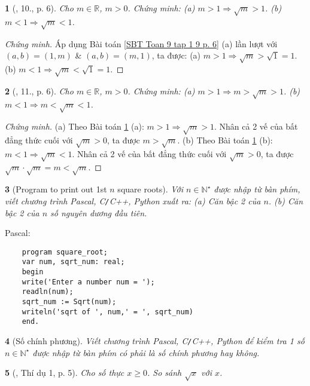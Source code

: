 \documentclass{article}
\newtheorem{baitoan}{}%
\begin{document}
\begin{baitoan}[\cite{SBT_Toan_9_tap_1}, 10., p. 6]
	\label{SBT Toan 9 tap 1 10 p. 6}
	Cho $m \in\mathbb{R}$, $m > 0$. Chứng minh: (a) $m > 1\Rightarrow\sqrt{m} > 1$. (b) $m < 1\Rightarrow\sqrt{m} < 1$.
\end{baitoan}

\begin{proof}[Chứng minh]
	Áp dụng Bài toán \ref{SBT Toan 9 tap 1 9 p. 6} (a) lần lượt với $(a,b) = (1,m)$ \& $(a,b) = (m,1)$, ta được: (a) $m > 1\Rightarrow\sqrt{m} > \sqrt{1} = 1$. (b) $m < 1\Rightarrow\sqrt{m} < \sqrt{1} = 1$.
\end{proof}

\begin{baitoan}[\cite{SBT_Toan_9_tap_1}, 11., p. 6]
	Cho $m \in\mathbb{R}$, $m > 0$. Chứng minh: (a) $m > 1\Rightarrow m > \sqrt{m} > 1$. (b) $m < 1\Rightarrow m < \sqrt{m} < 1$.
\end{baitoan}

\begin{proof}[Chứng minh]
	(a) Theo Bài toán \ref{SBT Toan 9 tap 1 10 p. 6} (a): $m > 1\Rightarrow\sqrt{m} > 1$. Nhân cả 2 vế của bất đẳng thức cuối với $\sqrt{m} > 0$, ta được $m > \sqrt{m}$. (b) Theo Bài toán \ref{SBT Toan 9 tap 1 10 p. 6} (b): $m < 1\Rightarrow\sqrt{m} < 1$. Nhân cả 2 vế của bất đẳng thức cuối với $\sqrt{m} > 0$, ta được $\sqrt{m}\cdot\sqrt{m} = m < \sqrt{m}$.
\end{proof}

\begin{baitoan}[Program to print out 1st $n$ square roots]
	Với $n\in\mathbb{N}^\star$ được nhập từ bàn phím, viết chương trình {\sf Pascal, C\texttt{/}C++, Python} xuất ra: (a) Căn bậc 2 của $n$. (b) Căn bậc 2 của $n$ số nguyên dương đầu tiên. 
\end{baitoan}
Pascal:
\begin{verbatim}
	program square_root;
	var num, sqrt_num: real;		
	begin
	write('Enter a number num = ');
	readln(num);
	sqrt_num := Sqrt(num);
	writeln('sqrt of ', num,' = ', sqrt_num)
	end.
\end{verbatim}

\begin{baitoan}[Số chính phương]
	Viết chương trình {\sf Pascal, C\texttt{/}C++, Python} để kiểm tra 1 số $n\in\mathbb{N}^\star$ được nhập từ bàn phím có phải là số chính phương hay không.
\end{baitoan}

\begin{baitoan}[\cite{Tuyen_Toan_9_old}, Thí dụ 1, p. 5]
	Cho số thực $x\ge0$. So sánh $\sqrt{x}$ với $x$.
\end{baitoan}
\end{document}
